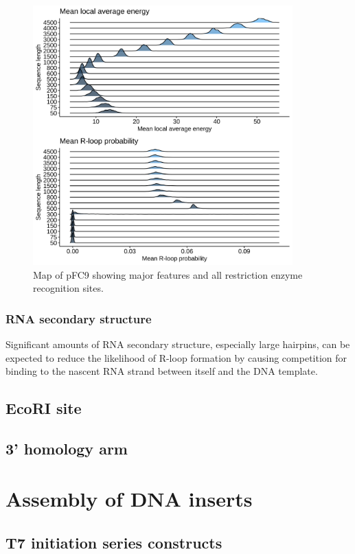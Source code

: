 \documentclass[11pt]{article}
\begin{document}
\begin{figure}[H]
	\includegraphics[width=10cm]{images/plots/rand_seq_LAE_dist.png}
	\centering
	\caption{Map of pFC9 showing major features and all restriction enzyme recognition sites.}
	\label{fig:pFC9}
\end{figure}

\subsubsection{RNA secondary structure}

Significant amounts of RNA secondary structure, especially large hairpins, can be expected to reduce the likelihood of R-loop formation by causing competition for binding to the nascent RNA strand between itself and the DNA template. 

\subsection{EcoRI site}

\subsection{3' homology arm}

\section{Assembly of DNA inserts}


\subsection{T7 initiation series constructs}
\label{T7:init} 
\end{document}
